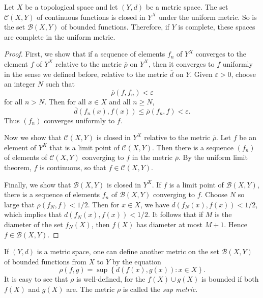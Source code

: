 \begin{theorem}
  Let \( X \) be a topological space and let \( (Y, d) \) be a metric space.
  The set \( \mathcal{C}(X, Y) \) of continuous functions is closed in \( Y^X \) under the uniform metric.
  So is the set \( \mathcal{B}(X, Y) \) of bounded functions.
  Therefore, if \( Y \) is complete, these spaces are complete in the uniform metric.
\end{theorem}
\begin{proof}
  First, we show that if a sequence of elements \( f_n \) of \( Y^X \) converges to the element \( f \) of \( Y^X \) relative to the metric \( \overline{\rho} \) on \( Y^X \), then it converges to \( f \) uniformly in the sense we defined before, relative to the metric \( \overline{d} \) on \( Y \).
  Given \( \varepsilon > 0 \), choose an integer \( N \) such that
  \[
    \overline{\rho}(f, f_n) < \varepsilon
  \]
  for all \( n > N \).
  Then for all \( x \in X \) and all \( n \geq N \),
  \[
    \overline{d}(f_n(x), f(x)) \leq \overline{\rho}(f_n, f) < \varepsilon.
  \]
  Thus \( (f_n) \) converges uniformly to \( f \).

  Now we show that \( \mathcal{C}(X, Y) \) is closed in \( Y^X \) relative to the metric \( \overline{\rho} \).
  Let \( f \) be an element of \( Y^X \) that is a limit point of \( \mathcal{C}(X, Y) \).
  Then there is a sequence \( (f_n) \) of elements of \( \mathcal{C}(X, Y) \) converging to \( f \) in the metric \( \overline{\rho} \).
  By the uniform limit theorem, \( f \) is continuous, so that \( f \in \mathcal{C}(X, Y) \).

  Finally, we show that \( \mathcal{B}(X, Y) \) is closed in \( Y^X \).
  If \( f \) is a limit point of \( \mathcal{B}(X, Y) \), there is a sequence of elements \( f_n \) of \( \mathcal{B}(X, Y) \) converging to \( f \).
  Choose \( N \) so large that \( \overline{\rho}(f_N, f) < 1 / 2 \).
  Then for \( x \in X \), we have \( \overline{d}(f_N(x), f(x)) < 1 / 2 \), which implies that \( d(f_N(x), f(x)) < 1/2 \).
  It follows that if \( M \) is the diameter of the set \( f_N(X) \), then \( f(X) \) has diameter at most \( M + 1 \).
  Hence \( f \in \mathcal{B}(X, Y) \).
\end{proof}

\begin{definition}
  If \( (Y, d) \) is a metric space, one can define another metric on the set \( \mathcal{B}(X, Y) \) of bounded functions from \( X \) to \( Y \) by the equation
  \[
    \rho(f, g) = \sup \left\lbrace d(f(x), g(x)): x \in X \right\rbrace.
  \]
  It is easy to see that \( \rho \) is well-defined, for the \( f(X) \cup g(X) \) is bounded if both \( f(X) \) and \( g(X) \) are.
  The metric \( \rho \) is called the \emph{sup metric}.
\end{definition}

